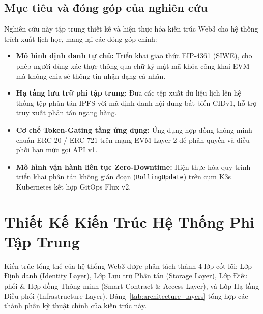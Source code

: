 \documentclass[11pt,a4paper]{article}
\begin{document}
\subsection{Mục tiêu và đóng góp của nghiên cứu}
Nghiên cứu này tập trung thiết kế và hiện thực hóa kiến trúc Web3 cho hệ thống trích xuất lịch học, mang lại các đóng góp chính:
\begin{itemize}
    \item \textbf{Mô hình định danh tự chủ:} Triển khai giao thức EIP-4361 (SIWE), cho phép người dùng xác thực thông qua chữ ký mật mã khóa công khai EVM mà không chia sẻ thông tin nhận dạng cá nhân.
    \item \textbf{Hạ tầng lưu trữ phi tập trung:} Đưa các tệp xuất dữ liệu lịch lên hệ thống tệp phân tán IPFS với mã định danh nội dung bất biến CIDv1, hỗ trợ truy xuất phân tán ngang hàng.
    \item \textbf{Cơ chế Token-Gating tầng ứng dụng:} Ứng dụng hợp đồng thông minh chuẩn ERC-20 / ERC-721 trên mạng EVM Layer-2 để phân quyền và điều phối hạn mức gọi API v1.
    \item \textbf{Mô hình vận hành liên tục Zero-Downtime:} Hiện thực hóa quy trình triển khai phân tán không gián đoạn (\texttt{RollingUpdate}) trên cụm K3s Kubernetes kết hợp GitOps Flux v2.
\end{itemize}

\section{Thiết Kế Kiến Trúc Hệ Thống Phi Tập Trung}

Kiến trúc tổng thể của hệ thống Web3 được phân tách thành 4 lớp cốt lõi: Lớp Định danh (Identity Layer), Lớp Lưu trữ Phân tán (Storage Layer), Lớp Điều phối \& Hợp đồng Thông minh (Smart Contract \& Access Layer), và Lớp Hạ tầng Điều phối (Infrastructure Layer). Bảng~\ref{tab:architecture_layers} tổng hợp các thành phần kỹ thuật chính của kiến trúc này.
\end{document}
